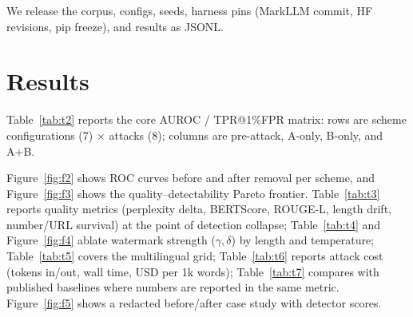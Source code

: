 \documentclass[10pt,letterpaper]{article}
\begin{document}
We release the corpus, configs, seeds, harness pins (MarkLLM commit, HF
revisions, pip freeze), and results as JSONL.

\begin{table}[t]
  \centering
  \caption{Attack taxonomy: family $\times$ mechanism $\times$
  implementation $\times$ prior-art anchor.}
  \label{tab:t1}
  
\end{table}

\section{Results}
Table~\ref{tab:t2} reports the core AUROC / TPR@1\%FPR matrix: rows
are scheme configurations (7) $\times$ attacks (8); columns are
pre-attack, A-only, B-only, and A+B.

Figure~\ref{fig:f2} shows ROC curves before and after removal per
scheme, and Figure~\ref{fig:f3} shows the quality--detectability
Pareto frontier. Table~\ref{tab:t3} reports quality metrics
(perplexity delta, BERTScore, ROUGE-L, length drift, number/URL
survival) at the point of detection collapse; Table~\ref{tab:t4} and
Figure~\ref{fig:f4} ablate watermark strength ($\gamma,\delta$) by
length and temperature; Table~\ref{tab:t5} covers the multilingual
grid; Table~\ref{tab:t6} reports attack cost (tokens in/out, wall
time, USD per 1k words); Table~\ref{tab:t7} compares with published
baselines where numbers are reported in the same metric.
Figure~\ref{fig:f5} shows a redacted before/after case study with
detector scores.
\end{document}
